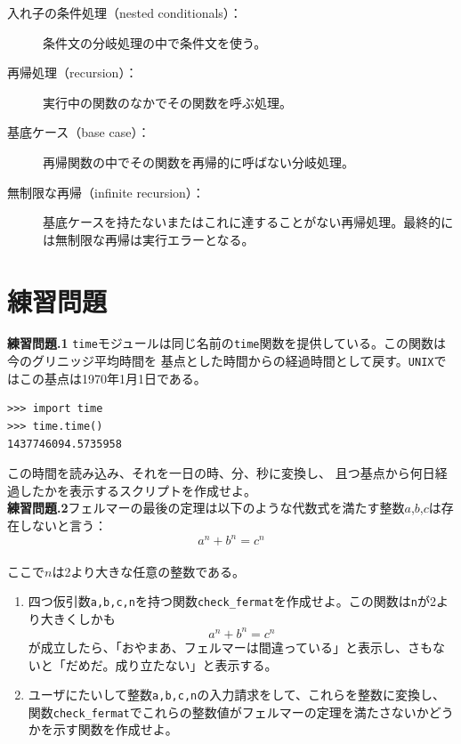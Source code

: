 \documentclass[a4j,12pt,makeidx]{jbook}
\newcommand{\tp}{\thechapter}
\begin{document}
\begin{description}
\item[入れ子の条件処理（nested conditionals）：]条件文の分岐処理の中で条件文を使う。  

\item[再帰処理（recursion）：]実行中の関数のなかでその関数を呼ぶ処理。 

\item[基底ケース（base case）：]再帰関数の中でその関数を再帰的に呼ばない分岐処理。

\item[無制限な再帰（infinite recursion）：]基底ケースを持たないまたはこれに達することがない再帰処理。最終的には無制限な再帰は実行エラーとなる。
\end{description}
%
\section{練習問題}

\noindent
{\bf 練習問題\tp.1} {\tt time}モジュールは同じ名前の{\tt time}関数を提供している。この関数は今のグリニッジ平均時間を
基点とした時間からの経過時間として戻す。{\tt UNIX}ではこの基点は1970年1月1日である。
\begin{verbatim}
>>> import time
>>> time.time()
1437746094.5735958
\end{verbatim}
この時間を読み込み、それを一日の時、分、秒に変換し、
且つ基点から何日経過したかを表示するスクリプトを作成せよ。\\

\noindent
{\bf 練習問題\tp.2}フェルマーの最後の定理は以下のような代数式を満たす整数$a$,$b$,$c$は存在しないと言う： \\
 \[ a^n + b^n = c^n \]　\\
ここで$n$は2より大きな任意の整数である。
\begin{enumerate}
\item 四つ仮引数{\tt a,b,c,n}を持つ関数{\tt check\_fermat}を作成せよ。この関数は{\tt n}が2より大きくしかも
 \[a^n + b^n = c^n \]
が成立したら、「おやまあ、フェルマーは間違っている」と表示し、さもないと「だめだ。成り立たない」と表示する。
\item ユーザにたいして整数{\tt a,b,c,n}の入力請求をして、これらを整数に変換し、
関数{\tt check\_fermat}でこれらの整数値がフェルマーの定理を満たさないかどうかを示す関数を作成せよ。
\end{enumerate}
\end{document}
